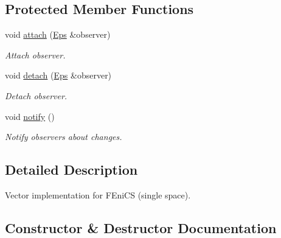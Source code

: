\subsection*{Protected Member Functions}
\begin{DoxyCompactItemize}
\item 
\hypertarget{classSpacy_1_1Mixin_1_1MixinConnection_abb5520ee6b22dd993d78f142939a1ed4}{}void \hyperlink{classSpacy_1_1Mixin_1_1MixinConnection_abb5520ee6b22dd993d78f142939a1ed4}{attach} (\hyperlink{classSpacy_1_1Mixin_1_1Eps_a51dbe0b9cc950e0f3dfd34a481f08ae4_a51dbe0b9cc950e0f3dfd34a481f08ae4}{Eps} \&observer)\label{classSpacy_1_1Mixin_1_1MixinConnection_abb5520ee6b22dd993d78f142939a1ed4}

\begin{DoxyCompactList}\small\item\em Attach observer. \end{DoxyCompactList}\item 
\hypertarget{classSpacy_1_1Mixin_1_1MixinConnection_adda739590c487679c26f60e50aedb73f}{}void \hyperlink{classSpacy_1_1Mixin_1_1MixinConnection_adda739590c487679c26f60e50aedb73f}{detach} (\hyperlink{classSpacy_1_1Mixin_1_1Eps_a51dbe0b9cc950e0f3dfd34a481f08ae4_a51dbe0b9cc950e0f3dfd34a481f08ae4}{Eps} \&observer)\label{classSpacy_1_1Mixin_1_1MixinConnection_adda739590c487679c26f60e50aedb73f}

\begin{DoxyCompactList}\small\item\em Detach observer. \end{DoxyCompactList}\item 
\hypertarget{classSpacy_1_1Mixin_1_1MixinConnection_a1ddeaa78a3bb4a38c2cca36d1f99fe36}{}void \hyperlink{classSpacy_1_1Mixin_1_1MixinConnection_a1ddeaa78a3bb4a38c2cca36d1f99fe36}{notify} ()\label{classSpacy_1_1Mixin_1_1MixinConnection_a1ddeaa78a3bb4a38c2cca36d1f99fe36}

\begin{DoxyCompactList}\small\item\em Notify observers about changes. \end{DoxyCompactList}\end{DoxyCompactItemize}


\subsection{Detailed Description}
Vector implementation for F\+Eni\+C\+S (single space). 

\subsection{Constructor \& Destructor Documentation}
\hypertarget{classSpacy_1_1FEniCS_1_1Vector_ad73e826490b7b7be5588e9c0c9318cb5_ad73e826490b7b7be5588e9c0c9318cb5}{}
